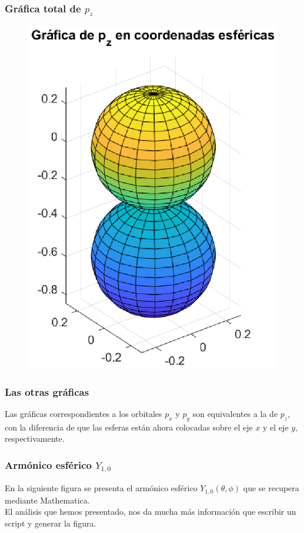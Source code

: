 \documentclass[12pt]{beamer}
\begin{document}
\begin{frame}
\frametitle{Gráfica total de $p_{z}$}
\begin{figure}[H]
    \centering
    \includegraphics[scale=0.65]{Imagenes/Plot_AER_pz_theta_total3D.eps}
\end{figure}
\end{frame}
\begin{frame}
\frametitle{Las otras gráficas}
Las gráficas correspondientes a los orbitales $p_{x}$ y $p_{y}$ son equivalentes a la de $p_{z}$, con la diferencia de que las esferas están ahora colocadas sobre el eje $x$ y el eje $y$, respectivamente.
\end{frame}
\begin{frame}
\frametitle{Armónico esférico $Y_{1,0}$}
En la siguiente figura se presenta el armónico esférico $Y_{1,0} (\theta, \phi)$ que se recupera mediante Mathematica.
\\
\bigskip
\pause
El análisis que hemos presentado, nos da mucha más información que escribir un script y generar la figura.
\end{frame}
\end{document}
